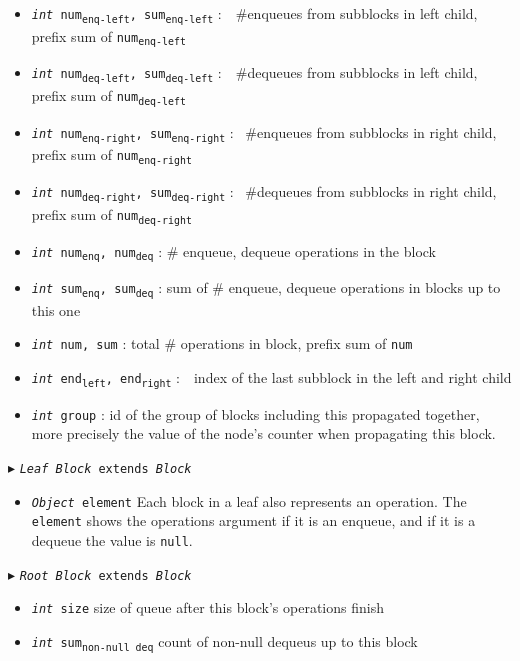 \documentclass[10pt]{article}
\theoremstyle{definition}
\begin{document}
\begin{algorithm}
\begin{algorithmic}[1]
\begin{multicols}{2}
\begin{itemize}
  \item \texttt{\textsl{int} num\textsubscript{enq-left}, sum\textsubscript{enq-left}}
  \textsf{:~~\#enqueues from subblocks in left child, prefix sum of \texttt{num\textsubscript{enq-left}}}
  \item \texttt{\textsl{int} num\textsubscript{deq-left}, sum\textsubscript{deq-left}}
  \textsf{:~~\#dequeues from subblocks in left child, prefix sum of \texttt{num\textsubscript{deq-left}}}
  \item \texttt{\textsl{int} num\textsubscript{enq-right}, \texttt{sum\textsubscript{enq-right}}}
  \textsf{: ~\#enqueues from subblocks in right child, prefix sum of \texttt{num\textsubscript{enq-right}}}
  \item \texttt{\textsl{int} num\textsubscript{deq-right}, \texttt{sum\textsubscript{deq-right}}}
  \textsf{: ~\#dequeues from subblocks in right child, prefix sum of \texttt{num\textsubscript{deq-right}}}
  \item \texttt{\textsl{int} num\textsubscript{enq}, num\textsubscript{deq}}
  \textsf{: \# enqueue, dequeue operations in the block}
  \item \texttt{\textsl{int} sum\textsubscript{enq}, sum\textsubscript{deq}}
  \textsf{: sum of \# enqueue, dequeue operations in blocks up to this one}
  \item \texttt{\textsl{int} num, sum}
  \textsf{: total \# operations in block, prefix sum of \texttt{num}}
  \item \texttt{\textsl{int} end\textsubscript{left}, end\textsubscript{right}}
  \textsf{:~~index of the last subblock in the left and right child}
  \item \texttt{\textsl{int} group}
  \textsf{: id of the group of blocks including this propagated together, more precisely the value of the node's counter when propagating this block.}
\end{itemize}

\pagebreak

\Statex $\blacktriangleright$ \texttt{\textsl{Leaf Block} extends \textsl{Block}}
\begin{itemize}
  \item \texttt{\textsl{Object} element}
  \textsf{Each block in a leaf also represents an operation. The \texttt{element} shows the operations argument if it is an enqueue, and if it is a dequeue the value is \texttt{null}.}
\end{itemize}

\Statex $\blacktriangleright$ \texttt{\textsl{Root Block} extends \textsl{Block}}
\begin{itemize}
  \item \texttt{\textsl{int} size}
  \textsf{size of queue after this block's operations finish}
  \item \texttt{\textsl{int} sum\textsubscript{non-null deq}}
  \textsf{count of non-null dequeus up to this block}
\end{itemize}


\end{multicols}
\end{algorithmic}
\end{algorithm}
\end{document}
